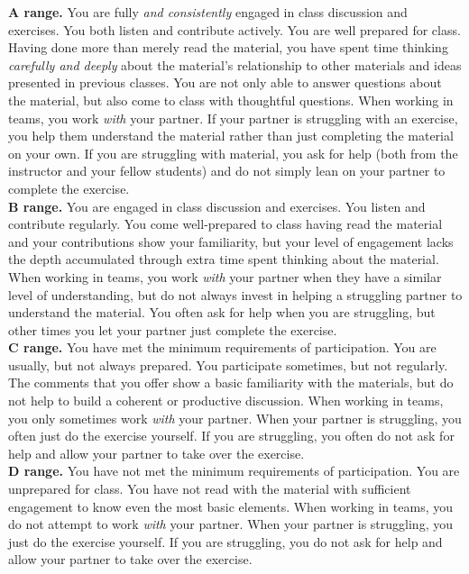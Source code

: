 \documentclass[12pt]{article}
\begin{document}
\textbf{A range.}  You are fully \emph{and consistently} engaged in class discussion and exercises.  You both listen and contribute actively.  You are well prepared for class.  Having done more than merely read the material, you have spent time thinking \emph{carefully and deeply} about the material's relationship to other materials and ideas presented in previous classes. You are not only able to answer questions about the material, but also come to class with thoughtful questions.  When working in teams, you work \emph{with} your partner. If your partner is struggling with an exercise, you help them understand the material rather than just completing the material on your own. If you are struggling with material, you ask for help (both from the instructor and your fellow students) and do not simply lean on your partner to complete the exercise. \\

\textbf{B range.}  You are engaged in class discussion and exercises.  You listen and contribute regularly.  You come well-prepared to class having read the material and your contributions show your familiarity, but your level of engagement lacks the depth accumulated through extra time spent thinking about the material.  When working in teams, you work \emph{with} your partner when they have a similar level of understanding, but do not always invest in helping a struggling partner to understand the material. You often ask for help when you are struggling, but other times you let your partner just complete the exercise. \\

\textbf{C range.}  You have met the minimum requirements of participation.  You are usually, but not always prepared.  You participate sometimes, but not regularly.  The comments that you offer show a basic familiarity with the materials, but do not help to build a coherent or productive discussion.  When working in teams, you only sometimes work \emph{with} your partner. When your partner is struggling, you often just do the exercise yourself. If you are struggling, you often do not ask for help and allow your partner to take over the exercise. \\

\textbf{D range.}  You have not met the minimum requirements of participation.  You are unprepared for class.  You have not read with the material with sufficient engagement to know even the most basic elements.  When working in teams, you do not attempt to work \emph{with} your partner. When your partner is struggling, you just do the exercise yourself. If you are struggling, you do not ask for help and allow your partner to take over the exercise.\\
\end{document}

